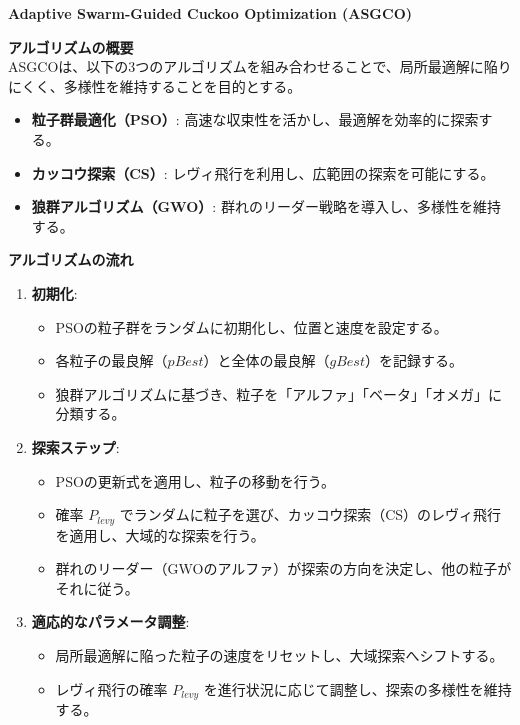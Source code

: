 \documentclass[a4paper]{ltjsarticle}
\begin{document}
\begin{tcolorbox}[arc=6mm, enhanced, borderline={0.5mm}{0mm}{black}, breakable, colback = white]
    \textbf{ Adaptive Swarm-Guided Cuckoo Optimization (ASGCO)}

    \vspace{10pt}

    \noindent \textbf{アルゴリズムの概要}\\
    ASGCOは、以下の3つのアルゴリズムを組み合わせることで、局所最適解に陥りにくく、多様性を維持することを目的とする。  
    \begin{itemize}
        \item \textbf{粒子群最適化（PSO）}: 高速な収束性を活かし、最適解を効率的に探索する。
        \item \textbf{カッコウ探索（CS）}: レヴィ飛行を利用し、広範囲の探索を可能にする。
        \item \textbf{狼群アルゴリズム（GWO）}: 群れのリーダー戦略を導入し、多様性を維持する。
    \end{itemize}

    \vspace{10pt}

    \noindent \textbf{アルゴリズムの流れ}
    \begin{enumerate}
        \item \textbf{初期化}:
        \begin{itemize}
            \item PSOの粒子群をランダムに初期化し、位置と速度を設定する。
            \item 各粒子の最良解（$pBest$）と全体の最良解（$gBest$）を記録する。
            \item 狼群アルゴリズムに基づき、粒子を「アルファ」「ベータ」「オメガ」に分類する。
        \end{itemize}
        
        \item \textbf{探索ステップ}:
        \begin{itemize}
            \item PSOの更新式を適用し、粒子の移動を行う。
            \item 確率 $P_{levy}$ でランダムに粒子を選び、カッコウ探索（CS）のレヴィ飛行を適用し、大域的な探索を行う。
            \item 群れのリーダー（GWOのアルファ）が探索の方向を決定し、他の粒子がそれに従う。
        \end{itemize}
        
        \item \textbf{適応的なパラメータ調整}:
        \begin{itemize}
            \item 局所最適解に陥った粒子の速度をリセットし、大域探索へシフトする。
            \item レヴィ飛行の確率 $P_{levy}$ を進行状況に応じて調整し、探索の多様性を維持する。
        \end{itemize}
        

\end{enumerate}
\end{tcolorbox}
\end{document}
